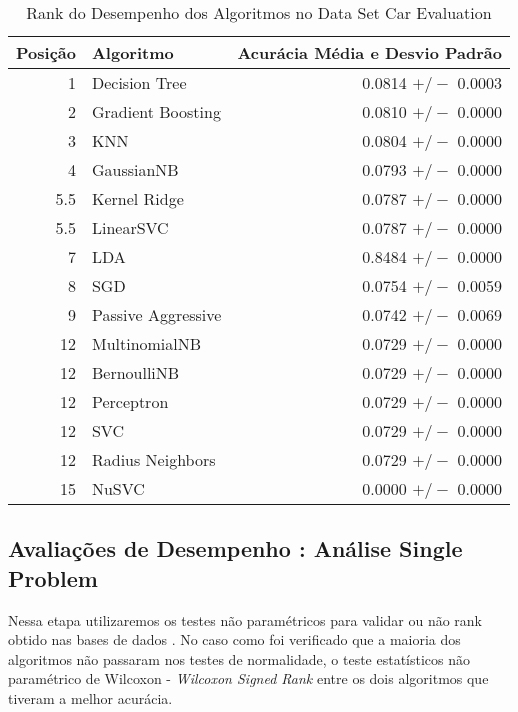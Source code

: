 \documentclass[11pt]{article}
\begin{document}
\label{RankCar}
\begin{table}[p]
\caption{Rank do Desempenho dos Algoritmos no Data Set Car Evaluation}
\centering
\begin{tabular}{r|l|r}
Posição & Algoritmo & Acur{\'a}cia M{\'e}dia e Desvio Padr{\~a}o\\
\hline
1 & Decision Tree & 0.0814 $+/-$ 0.0003 \\
2 & Gradient Boosting & 0.0810 $+/-$ 0.0000 \\
3 & KNN & 0.0804 $+/-$ 0.0000 \\
4 & GaussianNB & 0.0793 $+/-$ 0.0000 \\
5.5 & Kernel Ridge & 0.0787 $+/-$ 0.0000 \\
5.5 & LinearSVC & 0.0787 $+/-$ 0.0000 \\
7 & LDA & 0.8484 $+/-$ 0.0000 \\
8 & SGD & 0.0754 $+/-$ 0.0059 \\
9 & Passive Aggressive & 0.0742 $+/-$ 0.0069 \\
12 & MultinomialNB & 0.0729 $+/-$ 0.0000 \\
12 & BernoulliNB & 0.0729 $+/-$ 0.0000 \\
12 & Perceptron & 0.0729 $+/-$ 0.0000\\
12 & SVC  & 0.0729 $+/-$ 0.0000\\
12 & Radius Neighbors & 0.0729 $+/-$ 0.0000 \\
15 & NuSVC & 0.0000 $+/-$ 0.0000 \\
\end{tabular}
\end{table}
\subsection{Avaliações de Desempenho : Análise Single Problem}
    Nessa etapa utilizaremos os testes não paramétricos para validar ou não rank obtido nas bases de dados . No caso como foi verificado que a maioria dos algoritmos não passaram nos testes de normalidade, o teste estatísticos não paramétrico de Wilcoxon - \emph{Wilcoxon Signed Rank} entre os dois algoritmos que tiveram a melhor acurácia.
\end{document}
